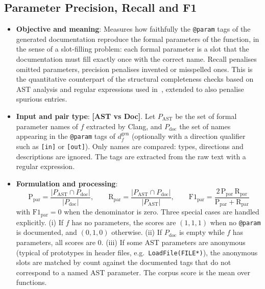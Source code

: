 \subsection{Parameter Precision, Recall and F1}
\label{sec:m-param-f1}
\begin{itemize}[leftmargin=*, label=\textbullet]
	\item \textbf{Objective and meaning}: Measures how faithfully the \texttt{@param} tags of the
	generated documentation reproduce the formal parameters of the function, in the sense of a
	slot-filling problem: each formal parameter is a slot that the documentation must fill exactly once
	with the correct name. Recall penalises omitted parameters, precision penalises invented or
	misspelled ones. This is the quantitative counterpart of the structural completeness checks based
	on AST analysis and regular expressions used in~\cite{yang_docagent_2025}, extended to also
	penalise spurious entries.
	
	\item \textbf{Input and pair type}: \textbf{[AST vs Doc]}. Let $P_{\mathrm{AST}}$ be the set of
	formal parameter names of $f$ extracted by Clang, and $P_{\mathrm{doc}}$ the set of names
	appearing in the \texttt{@param} tags of $d_f^{\mathrm{gen}}$ (optionally with a direction
	qualifier such as \texttt{[in]} or \texttt{[out]}). Only names are compared: types, directions
	and descriptions are ignored. The tags are extracted from the raw text with a regular expression.
	
	\item \textbf{Formulation and processing}:
	\begin{equation}
		\mathrm{P}_{\mathrm{par}} = \frac{|P_{\mathrm{AST}} \cap P_{\mathrm{doc}}|}{|P_{\mathrm{doc}}|},
		\qquad
		\mathrm{R}_{\mathrm{par}} = \frac{|P_{\mathrm{AST}} \cap P_{\mathrm{doc}}|}{|P_{\mathrm{AST}}|},
		\qquad
		\mathrm{F1}_{\mathrm{par}} = \frac{2\,\mathrm{P}_{\mathrm{par}}\,\mathrm{R}_{\mathrm{par}}}
		{\mathrm{P}_{\mathrm{par}}+\mathrm{R}_{\mathrm{par}}}
		\label{eq:param_f1}
	\end{equation}
	with $\mathrm{F1}_{\mathrm{par}}=0$ when the denominator is zero. Three special cases are handled
	explicitly. (i) If $f$ has no parameters, the scores are $(1,1,1)$ when no \texttt{@param} is
	documented, and $(0,1,0)$ otherwise. (ii) If $P_{\mathrm{doc}}$ is empty while $f$ has parameters,
	all scores are $0$. (iii) If some AST parameters are anonymous (typical of prototypes in header
	files, e.g.\ \texttt{LoadFile(FILE*)}), the anonymous slots are matched by count against the
	documented tags that do not correspond to a named AST parameter. The corpus score is the mean over
	functions.
	

\end{itemize}
